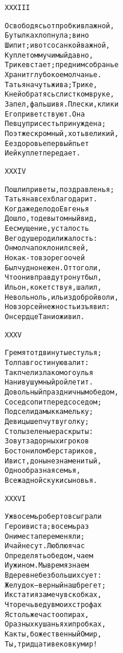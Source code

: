 \begin{minipage}[t]{\dimexpr 0.5\textwidth -\tabcolsep-.5pt}
\begin{alltt}\normalfont\centering
XXXIII

Освободясь от пробки влажной,
Бутылка хлопнула; вино
Шипит; и вот с осанкой важной,
Куплетом мучимый давно,
Трике встает; пред ним собранье
Хранит глубокое молчанье.
Татьяна чуть жива; Трике,
К ней обратясь с листком в руке,
Запел, фальшивя. Плески, клики
Его приветствуют. Она
Певцу присесть принуждена;
Поэт же скромный, хоть великий,
Ее здоровье первый пьет
И ей куплет передает.
\end{alltt}
\end{minipage}

\begin{minipage}[t]{\dimexpr 0.5\textwidth -\tabcolsep-.5pt}
\begin{alltt}\normalfont\centering
XXXIV

Пошли приветы, поздравленья;
Татьяна всех благодарит.
Когда же дело до Евгенья
Дошло, то девы томный вид,
Ее смущение, усталость
В его душе родили жалость:
Он молча поклонился ей,
Но как-то взор его очей
Был чудно нежен. Оттого ли,
Что он и вправду тронут был,
Иль он, кокетствуя, шалил,
Невольно ль, иль из доброй воли,
Но взор сей нежность изъявил:
Он сердце Тани оживил.
\end{alltt}
\end{minipage}
\clearpage

\begin{minipage}[t]{\dimexpr 0.5\textwidth -\tabcolsep-.5pt}
\begin{alltt}\normalfont\centering
XXXV

Гремят отдвинутые стулья;
Толпа в гостиную валит:
Так пчел из лакомого улья
На ниву шумный рой летит.
Довольный праздничным обедом,
Сосед сопит перед соседом;
Подсели дамы к камельку;
Девицы шепчут в уголку;
Столы зеленые раскрыты:
Зовут задорных игроков
Бостон и ломбер стариков,
И вист, доныне знаменитый,
Однообразная семья,
Все жадной скуки сыновья.
\end{alltt}
\end{minipage}

\begin{minipage}[t]{\dimexpr 0.5\textwidth -\tabcolsep-.5pt}
\begin{alltt}\normalfont\centering
XXXVI

Уж восемь робертов сыграли
Герои виста; восемь раз
Они места переменяли;
И чай несут. Люблю я час
Определять обедом, чаем
И ужином. Мы время знаем
В деревне без больших сует:
Желудок — верный наш брегет;
И кстати я замечу в скобках,
Что речь веду в моих строфах
Я столь же часто о пирах,
О разных кушаньях и пробках,
Как ты, божественный Омир,
Ты, тридцати веков кумир!
\end{alltt}
\end{minipage}
\clearpage

